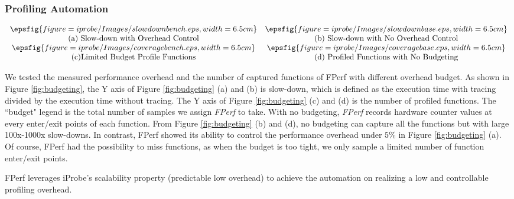 \subsubsection{Profiling Automation}

\begin{figure*}[!ht]
    \begin{center}
     $\begin{array} {cc}        
        \epsfig{figure=iprobe/Images/slowdownbench.eps,width=6.5cm} & \epsfig{figure=iprobe/Images/slowdownbase.eps,width=6.5cm}\\
        \mbox{(a) Slow-down with Overhead Control} & \mbox{(b) Slow-down with No Overhead Control}\\
        \epsfig{figure=iprobe/Images/coveragebench.eps,width=6.5cm} & \epsfig{figure=iprobe/Images/coveragebase.eps,width=6.5cm}\\
        \mbox{(c)Limited Budget Profile Functions} & \mbox{(d) Profiled Functions with No Budgeting}\\
        \end{array}$
    \end{center}
    \caption{Overhead Control and Number of Captured Functions Comparison.}
    \label{fig:budgeting}
\end{figure*} 

We tested the measured performance overhead and the number of captured functions of FPerf with different overhead budget. %
As shown in Figure \ref{fig:budgeting}, the Y axis of Figure \ref{fig:budgeting} (a) and (b) is slow-down, which is defined as the execution time with tracing divided by the execution time without tracing. 
The Y axis of Figure \ref{fig:budgeting} (c) and (d) is the number of profiled functions. The ``budget" legend is the total number of samples we assign \textit{FPerf} to take. 
With no budgeting, \textit{FPerf} records hardware counter values at every enter/exit points of each function. 
From Figure \ref{fig:budgeting} (b) and (d), no budgeting can capture all the functions but with large 100x-1000x slow-downs. 
In contrast, FPerf showed its ability to control the performance overhead under $5\%$ in Figure \ref{fig:budgeting} (a).
Of course, FPerf had the possibility to miss functions, as when the budget is too tight, we only sample a limited number of function enter/exit points.

FPerf leverages iProbe's scalability property (predictable low overhead) to achieve the automation on realizing a low and controllable profiling overhead.





